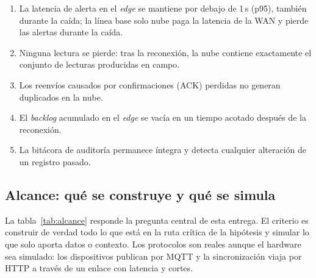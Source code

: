 \begin{enumerate}[leftmargin=*,label=\textbf{H\arabic*.}]
  \item La latencia de alerta en el \emph{edge} se mantiene por debajo de
        1\,s (p95), también durante la caída; la línea base solo nube paga la
        latencia de la WAN y pierde las alertas durante la caída.
  \item Ninguna lectura se pierde: tras la reconexión, la nube contiene
        exactamente el conjunto de lecturas producidas en campo.
  \item Los reenvíos causados por confirmaciones (ACK) perdidas no generan
        duplicados en la nube.
  \item El \emph{backlog} acumulado en el \emph{edge} se vacía en un tiempo
        acotado después de la reconexión.
  \item La bitácora de auditoría permanece íntegra y detecta cualquier
        alteración de un registro pasado.
\end{enumerate}

\subsection{Alcance: qué se construye y qué se simula}

La tabla~\ref{tab:alcance} responde la pregunta central de esta entrega. El
criterio es construir de verdad todo lo que está en la ruta crítica de la
hipótesis y simular lo que solo aporta datos o contexto. Los protocolos son
reales aunque el hardware sea simulado: los dispositivos publican por MQTT y la
sincronización viaja por HTTP a través de un enlace con latencia y cortes.

